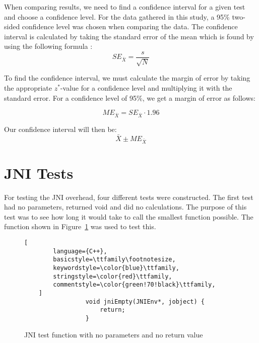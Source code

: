 When comparing results, we need to find a confidence interval for a given test and choose a confidence level. For the data gathered in this study, a 95\% two-sided confidence level was chosen when comparing the data. The confidence interval is calculated by taking the standard error of the mean which is found by using the following formula \cite[p.~304]{olofsson2012probability}:
\begin{equation*}
    SE_{\bar{X}} = \frac{s}{\sqrt{N}}
\end{equation*}

To find the confidence interval, we must calculate the margin of error by taking the appropriate $z^*$-value for a confidence level and multiplying it with the standard error. For a confidence level of 95\%, we get a margin of error as follows:

\begin{equation*}
    ME_{\bar{X}} = SE_{\bar{X}} \cdot 1.96
\end{equation*}

Our confidence interval will then be:
\begin{equation*}
    \bar{X} \pm ME_{\bar{X}}
\end{equation*}


\section{JNI Tests}
For testing the JNI overhead, four different tests were constructed. The first test had no parameters, returned void and did no calculations. The purpose of this test was to see how long it would take to call the smallest function possible. The function shown in Figure~\ref{fig:jni:empty} was used to test this.

\begin{figure}[H]
\begin{lstlisting}[
        language={C++},
        basicstyle=\ttfamily\footnotesize,
        keywordstyle=\color{blue}\ttfamily,
        stringstyle=\color{red}\ttfamily,
        commentstyle=\color{green!70!black}\ttfamily,
    ]
                 void jniEmpty(JNIEnv*, jobject) {
                     return;
                 }
\end{lstlisting}
\caption{JNI test function with no parameters and no return value}
\label{fig:jni:empty}
\end{figure}

